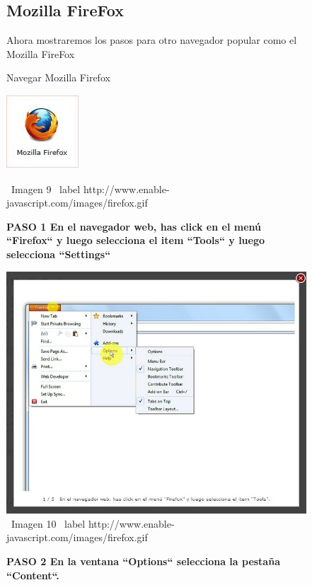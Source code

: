\documentclass[11pt]{article} %
\begin{document}
\begin{figure}
\subsection{Mozilla FireFox}

Ahora mostraremos los pasos para otro navegador popular como el Mozilla FireFox
\begin{center}
\begin{center}
Navegar Mozilla Firefox

\end{center}
\begin{center}
\includegraphics[height=3 cm, width=3 cm] {imagenes/firefox.JPG}
\end{center}


\ Imagen 9
\ label {http://www.enable-javascript.com/images/firefox.gif }

\begin{center}
\bf PASO 1 
En el navegador web, has click en el menú ``Firefox`` y luego selecciona el item ``Tools``
y luego selecciona ``Settings``
\end{center}

\includegraphics[height=8 cm, width=8 cm] {imagenes/firefox 01.JPG}
\newline
\newline
\ Imagen 10
\ label {http://www.enable-javascript.com/images/firefox.gif }

\begin{center}
\bf PASO 2
En la ventana ``Options`` selecciona la pestaña ``Content``.
\end{center}


\end{center}
\end{figure}
\end{document}
